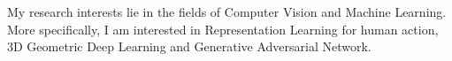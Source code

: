


\begin{cventries}

\cvtext
{ %
\begin{cvitems}
    My research interests lie in the fields of Computer Vision and Machine Learning. More specifically, I am interested in Representation Learning for human action, 3D Geometric Deep Learning and Generative Adversarial Network.
\end{cvitems}
}


\end{cventries}
